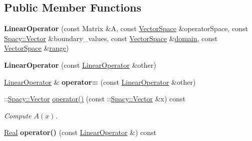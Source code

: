 \subsection*{\-Public \-Member \-Functions}
\begin{DoxyCompactItemize}
\item 
\hypertarget{classSpacy_1_1dealII_1_1LinearOperator_ab12fd45590e82cfaa4bfc73efda4ee4c}{{\bfseries \-Linear\-Operator} (const \-Matrix \&\-A, const \hyperlink{classSpacy_1_1VectorSpace}{\-Vector\-Space} \&operator\-Space, const \hyperlink{classSpacy_1_1Vector}{\-Spacy\-::\-Vector} \&boundary\-\_\-values, const \hyperlink{classSpacy_1_1VectorSpace}{\-Vector\-Space} \&\hyperlink{classSpacy_1_1OperatorBase_a2588f9b3e0188820c4c494e63293dc6f}{domain}, const \hyperlink{classSpacy_1_1VectorSpace}{\-Vector\-Space} \&\hyperlink{classSpacy_1_1OperatorBase_ab19d3b7a6f290b1079248f1e567e53d6}{range})}\label{classSpacy_1_1dealII_1_1LinearOperator_ab12fd45590e82cfaa4bfc73efda4ee4c}

\item 
\hypertarget{classSpacy_1_1dealII_1_1LinearOperator_a9eea3a814274ab47d7b6127135cb2c7c}{{\bfseries \-Linear\-Operator} (const \hyperlink{classSpacy_1_1dealII_1_1LinearOperator}{\-Linear\-Operator} \&other)}\label{classSpacy_1_1dealII_1_1LinearOperator_a9eea3a814274ab47d7b6127135cb2c7c}

\item 
\hypertarget{classSpacy_1_1dealII_1_1LinearOperator_a131d68e2e6d1b19616842fb2485bb7bc}{\hyperlink{classSpacy_1_1dealII_1_1LinearOperator}{\-Linear\-Operator} \& {\bfseries operator=} (const \hyperlink{classSpacy_1_1dealII_1_1LinearOperator}{\-Linear\-Operator} \&other)}\label{classSpacy_1_1dealII_1_1LinearOperator_a131d68e2e6d1b19616842fb2485bb7bc}

\item 
\-::\hyperlink{classSpacy_1_1Vector}{\-Spacy\-::\-Vector} \hyperlink{classSpacy_1_1dealII_1_1LinearOperator_a619887409321d9effeec2ce049a0d6d0}{operator()} (const \-::\hyperlink{classSpacy_1_1Vector}{\-Spacy\-::\-Vector} \&x) const 
\begin{DoxyCompactList}\small\item\em \-Compute $A(x)$. \end{DoxyCompactList}\item 
\hypertarget{classSpacy_1_1dealII_1_1LinearOperator_a2cf1cb0ad567fe4c3f56c129c47fb7e3}{\hyperlink{classSpacy_1_1Real}{\-Real} {\bfseries operator()} (const \hyperlink{classSpacy_1_1dealII_1_1LinearOperator}{\-Linear\-Operator} \&) const }\label{classSpacy_1_1dealII_1_1LinearOperator_a2cf1cb0ad567fe4c3f56c129c47fb7e3}


\end{DoxyCompactItemize}
